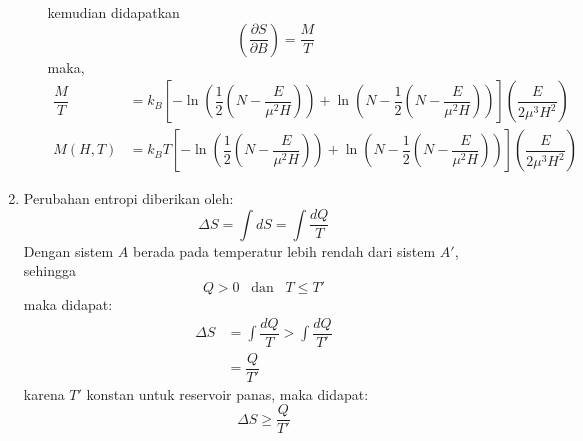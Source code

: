 \begin{enumerate}
\begin{enumerate}[(a)]
         kemudian didapatkan
        \begin{equation*}
            \left(\dfrac{\partial S}{\partial B}\right)=\dfrac{M}{T}
        \end{equation*}
        maka,
        \begin{equation*}
            \begin{split}
                \dfrac{M}{T}&=k_B\left[-\ln \left(\dfrac{1}{2}\left(N-
                \dfrac{E}{\mu^2H}\right)\right)+\ln\left(N-\dfrac{1}{2}\left(N-
                \dfrac{E}{\mu^2H}\right)\right)\right]\left(\dfrac{E}{2\mu^3H^2}\right)\\
                M(H,T)&=k_BT\left[-\ln \left(\dfrac{1}{2}\left(N-
                \dfrac{E}{\mu^2H}\right)\right)+\ln\left(N-\dfrac{1}{2}\left(N-
                \dfrac{E}{\mu^2H}\right)\right)\right]\left(\dfrac{E}{2\mu^3H^2}\right)
            \end{split}
        \end{equation*}
    \end{enumerate}
    \item Perubahan entropi diberikan oleh:
    \begin{equation*}
        \Delta S=\int dS=\int \dfrac{dQ}{T}
    \end{equation*}
    Dengan sistem $A$ berada pada temperatur lebih rendah dari sistem $A\prime$, sehingga 
    \begin{equation*}
        Q>0\;\;\;\text{dan}\;\;\;T\leq T\prime
    \end{equation*}
    maka didapat:
    \begin{equation*}
        \begin{split}
            \Delta S&=\int \dfrac{dQ}{T}>\int\dfrac{dQ}{T\prime}\\
            &=\dfrac{Q}{T\prime}
        \end{split}
    \end{equation*}
    karena $T\prime$ konstan untuk reservoir panas, maka didapat:
    \begin{equation*}
        \Delta S\geq \dfrac{Q}{T\prime}
    \end{equation*}
\end{enumerate}